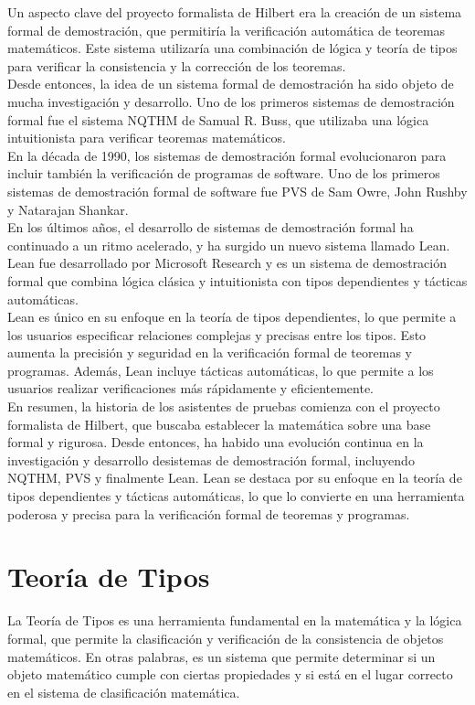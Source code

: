 \documentclass{article}
\begin{document}
Un aspecto clave del proyecto formalista de Hilbert era la creación de un sistema formal de demostración, que permitiría la verificación automática de teoremas matemáticos. Este sistema utilizaría una combinación de lógica y teoría de tipos para verificar la consistencia y la corrección de los teoremas.\\

Desde entonces, la idea de un sistema formal de demostración ha sido objeto de mucha investigación y desarrollo. Uno de los primeros sistemas de demostración formal fue el sistema NQTHM de Samual R. Buss, que utilizaba una lógica intuitionista para verificar teoremas matemáticos.\\

En la década de 1990, los sistemas de demostración formal evolucionaron para incluir también la verificación de programas de software. Uno de los primeros sistemas de demostración formal de software fue PVS de Sam Owre, John Rushby y Natarajan Shankar.\\

En los últimos años, el desarrollo de sistemas de demostración formal ha continuado a un ritmo acelerado, y ha surgido un nuevo sistema llamado Lean. Lean fue desarrollado por Microsoft Research y es un sistema de demostración formal que combina lógica clásica y intuitionista con tipos dependientes y tácticas automáticas.\\

Lean es único en su enfoque en la teoría de tipos dependientes, lo que permite a los usuarios especificar relaciones complejas y precisas entre los tipos. Esto aumenta la precisión y seguridad en la verificación formal de teoremas y programas. Además, Lean incluye tácticas automáticas, lo que permite a los usuarios realizar verificaciones más rápidamente y eficientemente.\\

En resumen, la historia de los asistentes de pruebas comienza con el proyecto formalista de Hilbert, que buscaba establecer la matemática sobre una base formal y rigurosa. Desde entonces, ha habido una evolución continua en la investigación y desarrollo desistemas de demostración formal, incluyendo NQTHM, PVS y finalmente Lean. Lean se destaca por su enfoque en la teoría de tipos dependientes y tácticas automáticas, lo que lo convierte en una herramienta poderosa y precisa para la verificación formal de teoremas y programas.

\section{Teoría de Tipos}
La Teoría de Tipos es una herramienta fundamental en la matemática y la lógica formal, que permite la clasificación y verificación de la consistencia de objetos matemáticos. En otras palabras, es un sistema que permite determinar si un objeto matemático cumple con ciertas propiedades y si está en el lugar correcto en el sistema de clasificación matemática.\\
\end{document}
